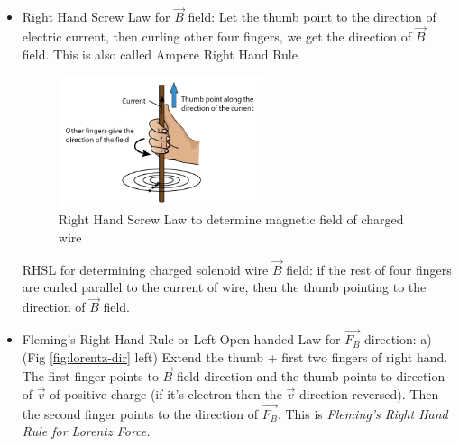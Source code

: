 \documentclass[12pt,a4paper,twoside]{article}
\begin{document}
    \begin{itemize}
        \item Right Hand Screw Law for $\overrightarrow{B}$ field: Let the thumb point to the direction of electric current, then curling other four fingers, we get the direction of $\overrightarrow{B}$ field. This is also called Ampere Right Hand Rule
        \begin{figure}[ht]
            \centering
            \includegraphics[width=6cm]{250-Revision/rhsl.png}
            \caption{Right Hand Screw Law to determine magnetic field of charged wire}
            \label{fig:RHSL}
        \end{figure}
        
        RHSL for determining charged solenoid wire $\overrightarrow{B}$ field: if the rest of four fingers are curled parallel to the current of wire, then the thumb pointing to the direction of $\overrightarrow{B}$ field.
        \item Fleming's Right Hand Rule or Left Open-handed Law for $\overrightarrow{F_B}$ direction:
            \subitem a) (Fig \ref{fig:lorentz-dir} left) Extend the thumb + first two fingers of right hand. The first finger points to $\overrightarrow{B}$ field direction and the thumb points to direction of $\overrightarrow{v}$ of positive charge (if it's electron then the $\overrightarrow{v}$ direction reversed). Then the second finger points to the direction of $\overrightarrow{F_B}$. This is \textit{Fleming's Right Hand Rule for Lorentz Force.}
            

\end{itemize}
\end{document}
